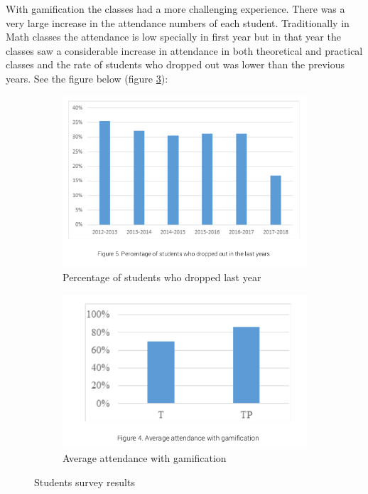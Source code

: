 \documentclass[../main.tex]{subfiles}
\begin{document}
With gamification the classes had a more challenging experience. There was a very large increase in the attendance numbers of each student. Traditionally in Math classes the attendance is low specially in first year but in that year the classes saw a considerable increase in attendance in both theoretical and practical classes and the rate of students who dropped out was lower than the previous years. See the figure below (figure \ref{fig:Students survey results}):
\begin{figure}[!ht]
     \centering
     \begin{subfigure}{0.4\textwidth}
         \centering
         \includegraphics[width=\textwidth]{images/chapter2/image20.png}
         \caption{Percentage of students who dropped last year}
         \label{fig:Percentage of students who dropped last year}
     \end{subfigure}
     \begin{subfigure}{0.4\textwidth}
         \centering
         \includegraphics[width=\textwidth]{images/chapter2/image15.png}
         \caption{Average attendance with gamification}
         \label{fig:Average attendance with gamification}
     \end{subfigure}
        \caption{Students survey results}
        \label{fig:Students survey results}
\end{figure}
\end{document}
